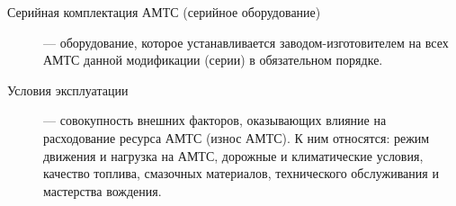 \begin{description}
	\item[Серийная комплектация  АМТС (серийное оборудование)] --- оборудование, которое устанавливается заводом-изготовителем на всех АМТС данной модификации (серии) в обязательном порядке. 
	
	\item[Условия эксплуатации] --- совокупность внешних факторов, оказывающих влияние на расходование ресурса АМТС (износ АМТС). К ним относятся: режим движения и нагрузка на АМТС, дорожные и климатические условия, качество топлива, смазочных материалов, технического обслуживания и мастерства вождения. 
	
	\cite{vin:z}
	
	\cite{molchanov:dlb}
	

\end{description}
